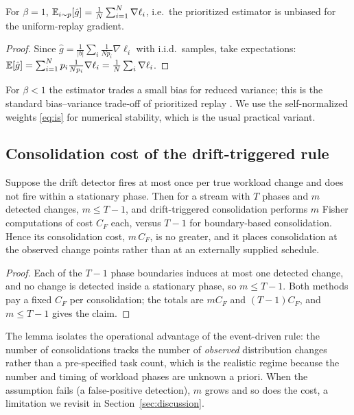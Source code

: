 \begin{proposition}[Unbiasedness]
\label{prop:per}
For \(\beta=1\), \(\mathbb{E}_{i\sim p}[\hat g] = \frac{1}{N}\sum_{i=1}^N \nabla\ell_i\),
i.e.\ the prioritized estimator is unbiased for the uniform-replay gradient.
\end{proposition}
\begin{proof}
Since $\hat g = \frac{1}{|b|}\sum_{i}\frac{1}{N p_i}\nabla\ell_i$ with i.i.d.\ samples,
take expectations:
\(\mathbb{E}[\hat g]=\sum_{i=1}^N p_i\frac{1}{N p_i}\nabla\ell_i=\frac{1}{N}\sum_i\nabla\ell_i\).
\end{proof}
For \(\beta<1\) the estimator trades a small bias for reduced variance; this is
the standard bias--variance trade-off of prioritized replay
\citep{schaul2016prioritized}. We use the self-normalized weights \eqref{eq:is}
for numerical stability, which is the usual practical variant.

\subsection{Consolidation cost of the drift-triggered rule}
\begin{lemma}
\label{lem:consolidation}
Suppose the drift detector fires at most once per true workload change and does
not fire within a stationary phase. Then for a stream with \(T\) phases and \(m\)
detected changes, \(m \le T-1\), and drift-triggered consolidation performs \(m\)
Fisher computations of cost \(C_F\) each, versus \(T-1\) for boundary-based
consolidation. Hence its consolidation cost, \(m\,C_F\), is no greater, and it
places consolidation at the observed change points rather than at an externally
supplied schedule.
\end{lemma}
\begin{proof}
Each of the \(T-1\) phase boundaries induces at most one detected change, and no
change is detected inside a stationary phase, so \(m\le T-1\). Both methods pay a
fixed \(C_F\) per consolidation; the totals are \(mC_F\) and \((T-1)C_F\), and
\(m\le T-1\) gives the claim.
\end{proof}
The lemma isolates the operational advantage of the event-driven rule: the number
of consolidations tracks the number of \emph{observed} distribution changes
rather than a pre-specified task count, which is the realistic regime because the
number and timing of workload phases are unknown a priori. When the assumption
fails (a false-positive detection), \(m\) grows and so does the cost, a
limitation we revisit in Section~\ref{sec:discussion}.

